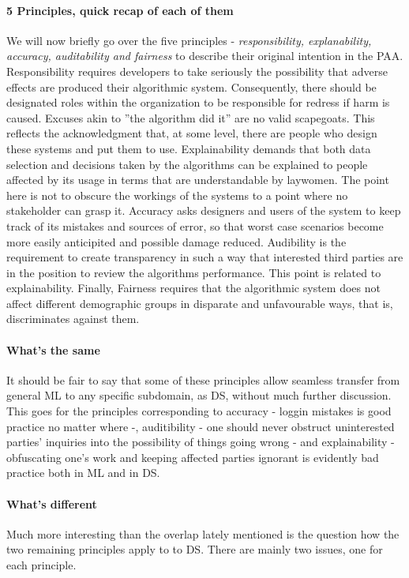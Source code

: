 \documentclass{article}
\begin{document}
\paragraph{5 Principles, quick recap of each of them}
We will now briefly go over the five principles - \emph{responsibility, explanability, accuracy, auditability and fairness} to describe their original intention in the PAA.
Responsibility requires developers to take seriously the possibility that adverse effects are produced their algorithmic system. Consequently, there should be designated roles within the organization to be responsible for redress if harm is caused. Excuses akin to ''the algorithm did it'' are no valid scapegoats. This reflects the acknowledgment that, at some level, there are people who design these systems and put them to use.
Explainability demands that both data selection and decisions taken by the algorithms can be explained to people affected by its usage in terms that are understandable by laywomen. The point here is not to obscure the workings of the systems to a point where no stakeholder can grasp it.
Accuracy asks designers and users of the system to keep track of its mistakes and sources of error, so that worst case scenarios become more easily anticipited and possible damage reduced.
Audibility is the requirement to create transparency in such a way that interested third parties are in the position to review the algorithms performance. This point is related to explainability.
Finally, Fairness requires that the algorithmic system does not affect different demographic groups in disparate and unfavourable ways, that is, discriminates against them.

\paragraph{What's the same}
It should be fair to say that some of these principles allow seamless transfer from general ML to any specific subdomain, as DS, without much further discussion.
This goes for the principles corresponding to accuracy - loggin mistakes is good practice no matter where -, auditibility - one should never obstruct uninterested parties' inquiries into the possibility of things going wrong - and explainability - obfuscating one's work and keeping affected parties ignorant is evidently bad practice both in ML and in DS.

\paragraph{What's different}
Much more interesting than the overlap lately mentioned is the question how the two remaining principles apply to to DS.
There are mainly two issues, one for each principle. 
\end{document}
